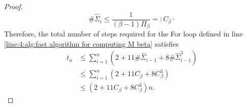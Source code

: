 \begin{proof}
\begin{equation}
        \# \hat \Sigma_{i} \leq \frac{1}{(\beta-1)\Pi_\beta} =: C_\beta\cdot
    \end{equation}
    Therefore, the total number of steps required for the For loop defined in line \ref{line:4:alg:fast algorithm for computing M beta} satisfies
    \begin{align}
        t_n &\leq \sum_{i=1}^n \left(2 + 11\#\hat \Sigma_{i-1} + 8 \#\hat \Sigma_{i-1}^3\right)\\
        &\leq \sum_{i=1}^n \left(2 + 11 C_\beta + 8 C_\beta^3\right)\\
        &\leq \left(2 + 11 C_\beta + 8 C_\beta^3\right) n.
    \end{align}
\end{proof}






